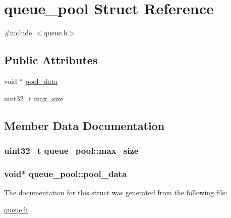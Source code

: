 \hypertarget{structqueue__pool}{}\section{queue\+\_\+pool Struct Reference}
\label{structqueue__pool}


{\ttfamily \#include $<$queue.\+h$>$}

\subsection*{Public Attributes}
\begin{DoxyCompactItemize}
\item 
void $\ast$ \hyperlink{structqueue__pool_aed534e481a372f21f1119c0e78823704}{pool\+\_\+data}
\item 
uint32\+\_\+t \hyperlink{structqueue__pool_a143db1d6db354872ef1228aeef7c4f8e}{max\+\_\+size}
\end{DoxyCompactItemize}


\subsection{Member Data Documentation}
\hypertarget{structqueue__pool_a143db1d6db354872ef1228aeef7c4f8e}{}
\subsubsection[{max\+\_\+size}]{\setlength{\rightskip}{0pt plus 5cm}uint32\+\_\+t queue\+\_\+pool\+::max\+\_\+size}\label{structqueue__pool_a143db1d6db354872ef1228aeef7c4f8e}
\hypertarget{structqueue__pool_aed534e481a372f21f1119c0e78823704}{}
\subsubsection[{pool\+\_\+data}]{\setlength{\rightskip}{0pt plus 5cm}void$\ast$ queue\+\_\+pool\+::pool\+\_\+data}\label{structqueue__pool_aed534e481a372f21f1119c0e78823704}


The documentation for this struct was generated from the following file\+:\begin{DoxyCompactItemize}
\item 
\hyperlink{queue_8h}{queue.\+h}\end{DoxyCompactItemize}
